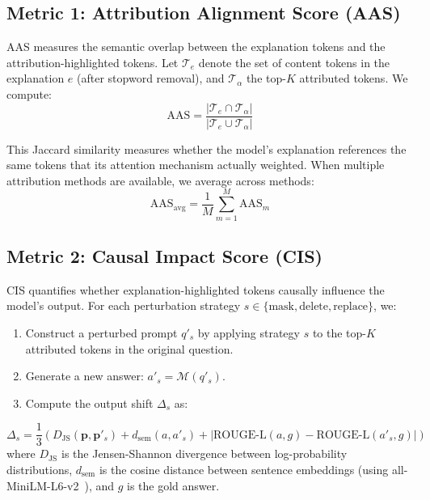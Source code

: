 \subsection{Metric 1: Attribution Alignment Score (AAS)}

AAS measures the semantic overlap between the explanation tokens and the attribution-highlighted tokens. Let $\mathcal{T}_e$ denote the set of content tokens in the explanation $e$ (after stopword removal), and $\mathcal{T}_\alpha$ the top-$K$ attributed tokens. We compute:
\begin{equation}
    \text{AAS} = \frac{|\mathcal{T}_e \cap \mathcal{T}_\alpha|}{|\mathcal{T}_e \cup \mathcal{T}_\alpha|}
\end{equation}

This Jaccard similarity measures whether the model's explanation references the same tokens that its attention mechanism actually weighted. When multiple attribution methods are available, we average across methods:
\begin{equation}
    \text{AAS}_{\text{avg}} = \frac{1}{M} \sum_{m=1}^{M} \text{AAS}_m
\end{equation}

\subsection{Metric 2: Causal Impact Score (CIS)}

CIS quantifies whether explanation-highlighted tokens causally influence the model's output. For each perturbation strategy $s \in \{\text{mask}, \text{delete}, \text{replace}\}$, we:

\begin{enumerate}
    \item Construct a perturbed prompt $q'_s$ by applying strategy $s$ to the top-$K$ attributed tokens in the original question.
    \item Generate a new answer: $a'_s = \mathcal{M}(q'_s)$.
    \item Compute the output shift $\Delta_s$ as:
\end{enumerate}
\begin{equation}
    \Delta_s = \frac{1}{3}\left(D_{\text{JS}}(\mathbf{p}, \mathbf{p}'_s) + d_{\text{sem}}(a, a'_s) + |\text{ROUGE-L}(a, g) - \text{ROUGE-L}(a'_s, g)|\right)
\end{equation}
where $D_{\text{JS}}$ is the Jensen-Shannon divergence between log-probability distributions, $d_{\text{sem}}$ is the cosine distance between sentence embeddings (using all-MiniLM-L6-v2~\cite{reimers2019sentence}), and $g$ is the gold answer.

